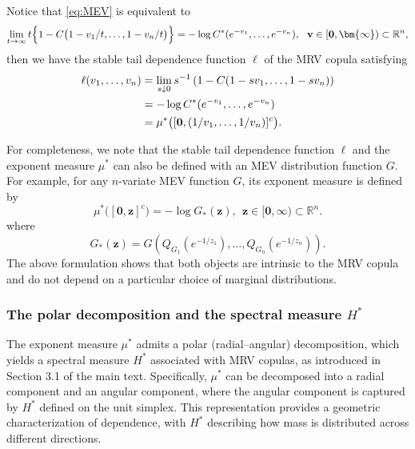 \documentclass[12pt]{article}
\theoremstyle{plain}
\theoremstyle{plain}
\theoremstyle{definition}
\newcommand{\R}{\mathbb{R}}
\begin{document}
Notice that \eqref{eq:MEV} is equivalent to 
\begin{equation*} 
	\lim_{t\to\infty}
	t\Bigl\{1-C\bigl(1-v_1/t ,\ldots, 1- v_n/t \bigr)\Bigr\}
	=-\log C^* (e^{-v_1},\ldots,e^{-v_n}),
	~~
	\mathbf{v}\in[\mathbf{0},\bm{\infty})\subset\R^n,
\end{equation*}
then we have the stable tail dependence function $\ell$ of the MRV copula satisfying
\begin{align} \label{eq:260127-10}
	\ell(v_1,\dots,v_n)
	& = \lim_{s\downarrow0} s^{-1} \left(1 - C(1 - sv_1, \dots, 1 - sv_n)\right)\notag\\
	&=   -\log C^* (e^{-v_1},\ldots,e^{-v_n})\notag\\
	& =\mu^{*}\bigl([\mathbf{0},(1/v_1,\ldots,1/v_n)]^c\bigr).
\end{align}

For completeness, we note that the stable tail dependence function $\ell$ and the exponent measure $\mu^*$ can also be defined with an MEV distribution function $G$. For example, for any $n$-variate MEV function $G$, its exponent measure is defined by
\[
\mu^{*}\bigl([\mathbf{0},\mathbf{z}]^c\bigr)=-\log G_{*}(\mathbf{z}),
~~\mathbf{z}\in[\mathbf{0},\bm{\infty})\subset\R^n.
\]
where
\[
G_{*}(\mathbf{z})=G\!\left(
Q_{G_1}(e^{-1/z_1}),\ldots,
Q_{G_n}(e^{-1/z_n})
\right).
\]
The above formulation shows that both objects are intrinsic to the MRV copula and do not depend on a particular choice of marginal distributions.

\subsubsection{The polar decomposition and the spectral measure $H^*$}
The exponent measure $\mu^*$ admits a polar (radial–angular) decomposition, which yields a spectral measure $H^*$ associated with MRV copulas, as introduced in Section 3.1 of the main text. Specifically, $\mu^*$ can be decomposed into a radial component and an angular component, where the angular component is captured by $H^*$ defined on the unit simplex. This representation provides a geometric characterization of dependence, with $H^*$ describing how mass is distributed across different directions.
\end{document}
